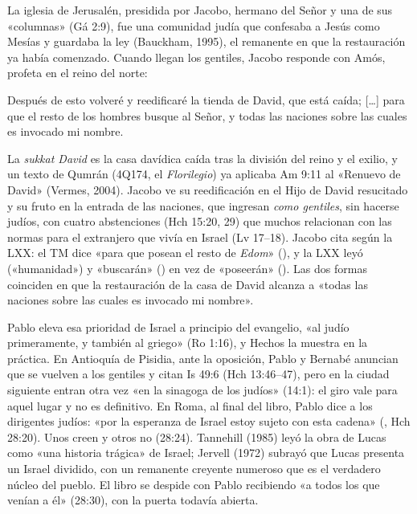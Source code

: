 La iglesia de Jerusalén, presidida por Jacobo, hermano del Señor y una de sus «columnas» (Gá 2:9), fue una comunidad judía que confesaba a Jesús como Mesías y guardaba la ley (Bauckham, 1995), el remanente en que la restauración ya había comenzado. Cuando llegan los gentiles, Jacobo responde con Amós, profeta en el reino del norte:

\begin{cita}Después de esto volveré y reedificaré la tienda de David, que está caída; [\ldots] para que el resto de los hombres busque al Señor, y todas las naciones sobre las cuales es invocado mi nombre.\end{cita}

La \emph{sukkat David} es la casa davídica caída tras la división del reino y el exilio, y un texto de Qumrán (4Q174, el \emph{Florilegio}) ya aplicaba Am 9:11 al «Renuevo de David» (Vermes, 2004). Jacobo ve su reedificación en el Hijo de David resucitado y su fruto en la entrada de las naciones, que ingresan \emph{como gentiles}, sin hacerse judíos, con cuatro abstenciones (Hch 15:20, 29) que muchos relacionan con las normas para el extranjero que vivía en Israel (Lv 17--18). Jacobo cita según la LXX: el TM dice «para que posean el resto de \emph{Edom}» (), y la LXX leyó  («humanidad») y «buscarán» () en vez de «poseerán» (). Las dos formas coinciden en que la restauración de la casa de David alcanza a «todas las naciones sobre las cuales es invocado mi nombre».

Pablo eleva esa prioridad de Israel a principio del evangelio, «al judío primeramente, y también al griego» (Ro 1:16), y Hechos la muestra en la práctica. En Antioquía de Pisidia, ante la oposición, Pablo y Bernabé anuncian que se vuelven a los gentiles y citan Is 49:6 (Hch 13:46--47), pero en la ciudad siguiente entran otra vez «en la sinagoga de los judíos» (14:1): el giro vale para aquel lugar y no es definitivo. En Roma, al final del libro, Pablo dice a los dirigentes judíos: «por la esperanza de Israel estoy sujeto con esta cadena» (, Hch 28:20). Unos creen y otros no (28:24). Tannehill (1985) leyó la obra de Lucas como «una historia trágica» de Israel; Jervell (1972) subrayó que Lucas presenta un Israel dividido, con un remanente creyente numeroso que es el verdadero núcleo del pueblo. El libro se despide con Pablo recibiendo «a todos los que venían a él» (28:30), con la puerta todavía abierta.

